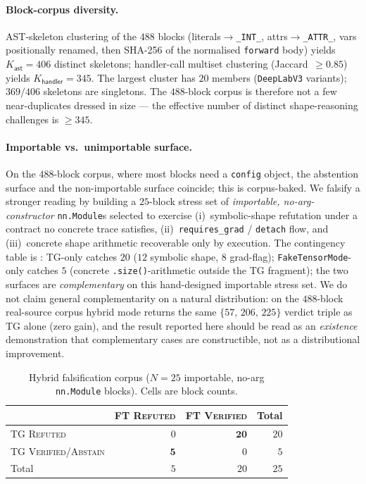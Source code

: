 \paragraph{Block-corpus diversity.}
AST-skeleton clustering of the $488$ blocks (literals$\to$\texttt{\_INT\_},
attrs$\to$\texttt{\_ATTR\_}, vars positionally renamed, then
SHA-256 of the normalised \texttt{forward} body) yields
$K_{\mathsf{ast}}{=}406$ distinct skeletons; handler-call
multiset clustering (Jaccard~$\ge 0.85$) yields
$K_{\mathsf{handler}}{=}345$. The largest cluster has $20$
members (\texttt{DeepLabV3} variants); $369/406$ skeletons are
singletons. The $488$-block corpus is therefore not a few
near-duplicates dressed in size --- the effective number of
distinct shape-reasoning challenges is $\ge 345$.

\paragraph{Importable vs.\ unimportable surface.}
On the $488$-block corpus, where most blocks need a
\texttt{config} object, the abstention surface and the
non-importable surface coincide; this is corpus-baked. We
falsify a stronger reading by building a $25$-block stress set
of \emph{importable, no-arg-constructor} \texttt{nn.Module}s
selected to exercise (i)~symbolic-shape refutation under a
contract no concrete trace satisfies, (ii)~\texttt{requires\_grad}
/ \texttt{detach} flow, and (iii)~concrete shape arithmetic
recoverable only by execution. The contingency table is
: \textsc{TG}-only catches $20$
($12$ symbolic shape, $8$ grad-flag); \texttt{FakeTensorMode}-only
catches $5$ (concrete \texttt{.size()}-arithmetic outside the
\textsc{TG} fragment); the two surfaces are \emph{complementary}
on this hand-designed importable stress set. We do not claim
general complementarity on a natural distribution: on the
$488$-block real-source corpus hybrid mode returns the same
$\{57,\,206,\,225\}$ verdict triple as \textsc{TG} alone
(zero gain), and the result reported here should be read as an
\emph{existence} demonstration that complementary cases are
constructible, not as a distributional improvement.

\begin{table}[t]
\centering\small\setlength{\tabcolsep}{6pt}
\caption{Hybrid falsification corpus ($N{=}25$ importable, no-arg
\texttt{nn.Module} blocks). Cells are block counts.}
\label{tab:hybrid-falsify}
\begin{tabular}{l rr | r}
\toprule
& FT \textsc{Refuted} & FT \textsc{Verified} & Total \\
\midrule
\textsc{TG} \textsc{Refuted} & $0$ & $\mathbf{20}$ & $20$ \\
\textsc{TG} \textsc{Verified/Abstain} & $\mathbf{5}$ & $0$ & $5$ \\
\midrule
Total & $5$ & $20$ & $25$ \\
\bottomrule
\end{tabular}
\end{table}

